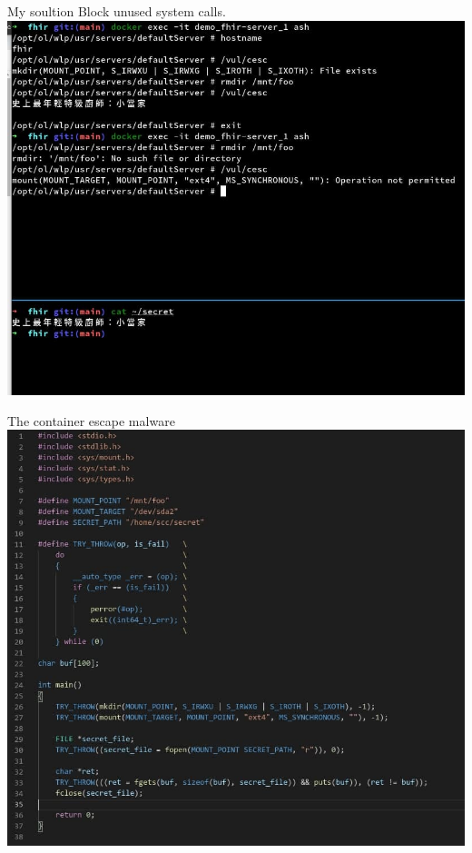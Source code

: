 \documentclass{beamer}
\begin{document}
\begin{CJK*}{UTF8}{bsmi}
  \begin{frame}{My soultion}
    Block unused system calls.\\
    \includegraphics[width=\textwidth]{photo_2021-09-17_15-41-37.jpg}
  \end{frame}

  \begin{frame}{The container escape malware}
    \centering
    \includegraphics[height=.95\textheight]{photo_2021-09-17_06-09-47.jpg}
  \end{frame}


\end{CJK*}
\end{document}
